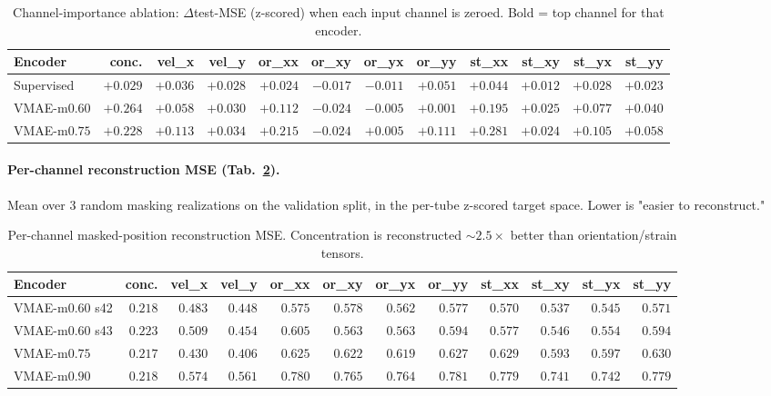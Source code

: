 \documentclass{article}
\begin{document}
\begin{table}[h]
\centering
\caption{Channel-importance ablation: $\Delta$test-MSE (z-scored) when each
input channel is zeroed. Bold = top channel for that encoder.}
\label{tab:channel-ablation}
\footnotesize
\setlength{\tabcolsep}{3pt}
\begin{tabular}{lrrrrrrrrrrr}
\toprule
\textbf{Encoder} & \textbf{conc.} & \textbf{vel\_x} & \textbf{vel\_y} & \textbf{or\_xx} & \textbf{or\_xy} & \textbf{or\_yx} & \textbf{or\_yy} & \textbf{st\_xx} & \textbf{st\_xy} & \textbf{st\_yx} & \textbf{st\_yy} \\
\midrule
Supervised      & $+0.029$ & $+0.036$ & $+0.028$ & $+0.024$ & $-0.017$ & $-0.011$ & $\mathbf{+0.051}$ & $+0.044$ & $+0.012$ & $+0.028$ & $+0.023$ \\
VMAE-m$0.60$ & $\mathbf{+0.264}$ & $+0.058$ & $+0.030$ & $+0.112$ & $-0.024$ & $-0.005$ & $+0.001$ & $+0.195$ & $+0.025$ & $+0.077$ & $+0.040$ \\
VMAE-m$0.75$ & $+0.228$ & $+0.113$ & $+0.034$ & $+0.215$ & $-0.024$ & $+0.005$ & $+0.111$ & $\mathbf{+0.281}$ & $+0.024$ & $+0.105$ & $+0.058$ \\
\bottomrule
\end{tabular}
\end{table}

\paragraph{Per-channel reconstruction MSE (Tab.~\ref{tab:recon-channel-mse}).}
Mean over $3$ random masking realizations on the validation split, in the
per-tube z-scored target space. Lower is "easier to reconstruct."

\begin{table}[h]
\centering
\caption{Per-channel masked-position reconstruction MSE. Concentration is
reconstructed $\sim$$2.5{\times}$ better than orientation/strain tensors.}
\label{tab:recon-channel-mse}
\footnotesize
\setlength{\tabcolsep}{3pt}
\begin{tabular}{lrrrrrrrrrrr}
\toprule
\textbf{Encoder} & \textbf{conc.} & \textbf{vel\_x} & \textbf{vel\_y} & \textbf{or\_xx} & \textbf{or\_xy} & \textbf{or\_yx} & \textbf{or\_yy} & \textbf{st\_xx} & \textbf{st\_xy} & \textbf{st\_yx} & \textbf{st\_yy} \\
\midrule
VMAE-m$0.60$ s42 & $\mathbf{0.218}$ & $0.483$ & $0.448$ & $0.575$ & $0.578$ & $0.562$ & $0.577$ & $0.570$ & $0.537$ & $0.545$ & $0.571$ \\
VMAE-m$0.60$ s43 & $\mathbf{0.223}$ & $0.509$ & $0.454$ & $0.605$ & $0.563$ & $0.563$ & $0.594$ & $0.577$ & $0.546$ & $0.554$ & $0.594$ \\
VMAE-m$0.75$    & $\mathbf{0.217}$ & $0.430$ & $0.406$ & $0.625$ & $0.622$ & $0.619$ & $0.627$ & $0.629$ & $0.593$ & $0.597$ & $0.630$ \\
VMAE-m$0.90$    & $\mathbf{0.218}$ & $0.574$ & $0.561$ & $0.780$ & $0.765$ & $0.764$ & $0.781$ & $0.779$ & $0.741$ & $0.742$ & $0.779$ \\
\bottomrule
\end{tabular}
\end{table}
\end{document}
